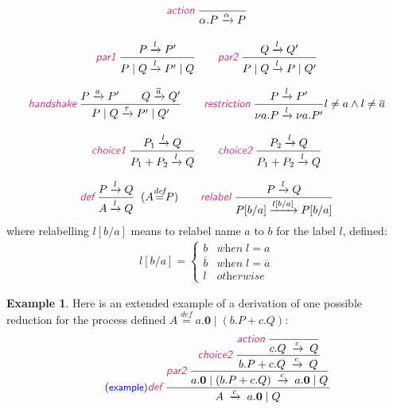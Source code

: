 \documentclass{article}
\newcommand{\exampleLabel}{\tag{\small{\textcolor{blue}{\textsf{example}}}}}
\theoremstyle{definition}
\newtheorem{example}{Example}
\newcommand{\trule}[1]{\textcolor{labelColor}{\textit{\textsf{#1}}}\;}
\begin{document}
\begin{mdframed}
\begin{center}
\begin{align*}
\begin{array}{c}
\trule{action}\dfrac{}{\alpha.P \xrightarrow{\alpha} P} \\[2em]
%
\trule{par1}{\dfrac{P \xrightarrow{l} P'}{P \mid Q \xrightarrow{l} P' \mid Q}}
\qquad
\trule{par2}{\dfrac{Q \xrightarrow{l} Q'}{P \mid Q \xrightarrow{l} P \mid Q'}} \\[2em]
\trule{handshake}\dfrac{P \xrightarrow{a} P' \qquad Q \xrightarrow{\overline{a}} Q'}
{P \mid Q \xrightarrow{\tau} P' \mid Q'}
\qquad
\trule{restriction}\dfrac{P \xrightarrow{l} P'}
{\nu a . P \xrightarrow{l} \nu a . P'} {l \neq a \wedge l \neq \overline{a}} \\[2em]
\trule{choice1}\dfrac{P_1 \xrightarrow{l} Q}{P_1 + P_2 \xrightarrow{l} Q}
\qquad
\trule{choice2}\dfrac{P_2 \xrightarrow{l} Q}{P_1 + P_2 \xrightarrow{l} Q} \\[2em]
\trule{def}
\dfrac{P \xrightarrow{l} Q}
      {A \xrightarrow{l} Q} \;\; (A {\mathrel{\mathop{=}\limits^{\textit{def}}}} P)
\qquad
\trule{relabel}
\dfrac{P \xrightarrow{l} Q}
      {P[b/a] \xrightarrow{l[b/a]} P[b/a]}
\end{array} \\
\end{align*}
where relabelling $l[b/a]$ means to relabel name $a$ to $b$ for the label $l$, defined:
%
\begin{align*}
l[b/a] = \begin{cases}
b & \textit{when} \;l = a \\
\overline{b} & \textit{when} \; l = \overline{a} \\
l & \textit{otherwise}
\end{cases}
\end{align*}
\end{center}
\end{mdframed}

\begin{example}
  Here is an extended example of a 
  derivation of one possible reduction for the process
defined $A \stackrel{\textit{def}}{=} a . \mathbf{0} \mid (b . P + c.Q)$:
%
\begin{align*}
  \exampleLabel{}
  \trule{def}
  \dfrac{
\trule{par2}
\dfrac{
\trule{choice2}
\dfrac{\trule{action}\dfrac{}{c . Q \; \xrightarrow{c} \; Q}}
{b . P + c.Q \; \xrightarrow{c} \; Q}}
{a . \mathbf{0} \mid (b . P + c.Q) \; \xrightarrow{c} \; a.\mathbf{0}
  \mid Q}
  }
  {A \; \xrightarrow{c} \; a.\mathbf{0} \mid Q}
\end{align*}
\end{example}
\end{document}
